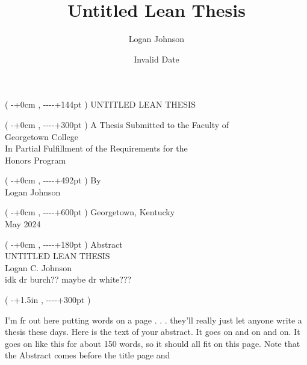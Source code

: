 \documentclass[
  letterpaper,
]{scrreprt}
\title{Untitled Lean Thesis}
\author{Logan Johnson}
\date{Invalid Date}
\theoremstyle{remark}
\begin{document}
\newcommand{\fromtop}[1]{%
  \dimexpr-1in-\topskip-\topmargin-\headheight-\headsep+#1\relax
}
\newcommand{\fromleft}[1]{%
  \dimexpr-1in-\oddsidemargin+#1\relax
}
\setlength{\textwidth}{6in}
\begin{titlepage}
\cleardoublepage
\thispagestyle{empty}
\begin{textblock*}{\paperwidth}(\fromleft{0cm},\fromtop{144pt})
\centering
UNTITLED LEAN THESIS
\end{textblock*}
\begin{textblock*}{\paperwidth}(\fromleft{0cm},\fromtop{300pt})
\centering
A Thesis Submitted to the Faculty of\\
\vspace{12pt}
Georgetown College\\
\vspace{12pt}
In Partial Fulfillment of the Requirements for the\\
\vspace{12pt}
Honors Program
\end{textblock*}
\begin{textblock*}{\paperwidth}(\fromleft{0cm},\fromtop{492pt})
\centering
By\\
\vspace{12pt}
Logan Johnson
\end{textblock*}
\begin{textblock*}{\paperwidth}(\fromleft{0cm},\fromtop{600pt})
\centering
Georgetown, Kentucky\\
\vspace{12pt}
May 2024
\end{textblock*}
\pagebreak
\thispagestyle{empty}
\begin{textblock*}{\paperwidth}(\fromleft{0cm},\fromtop{180pt})
\centering
Abstract\\
\vspace{12pt}
UNTITLED LEAN THESIS\\
\vspace{12pt}
Logan C. Johnson\\
\vspace{12pt}
idk dr burch?? maybe dr white???
\end{textblock*}
\begin{textblock*}{\textwidth}(\fromleft{1.5in},\fromtop{300pt})
\raggedright
I'm fr out here putting words on a page . . . they'll really just let anyone write a thesis these days. Here is the text of your abstract. It goes on and on and on. It goes on like this for about
150 words, so it should all fit on this page. Note that the Abstract comes before the title page and

\end{textblock*}
\end{titlepage}
\end{document}
